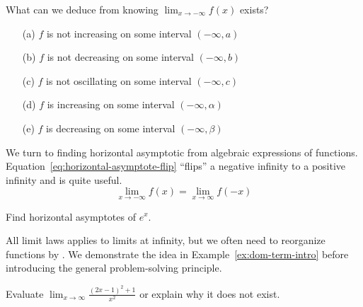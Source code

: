 \documentclass[../main.tex]{subfiles}
\begin{document}
\bigskip

\begin{example}
  What can we deduce from knowing \(\lim_{x \to -\infty} f(x)\) exists? 

  \begin{itemize}
    \item[(a)] \(f\) is not increasing on some interval \((-\infty, a)\)
    \item[(b)] \(f\) is not decreasing on some interval \((-\infty, b)\)
    \item[(c)] \(f\) is not oscillating on some interval \((-\infty, c)\)
    \item[(d)] \(f\) is increasing on some interval \((-\infty, \alpha)\)
    \item[(e)] \(f\) is decreasing on some interval \((-\infty, \beta)\)
  \end{itemize} 
\end{example}
\clearpage

We turn to finding horizontal asymptotic from algebraic expressions of functions. Equation~\eqref{eq:horizontal-asymptote-flip} ``flips'' a negative infinity to a positive infinity and is quite useful.
\begin{equation} \label{eq:horizontal-asymptote-flip}
  \lim_{x \to -\infty} f(x) = \lim_{x \to \infty} f(-x)
\end{equation}
\begin{center}
  \hfill{}
  
  \hfill{}
  
  \hfill{}
\end{center}

\begin{example}
  Find horizontal asymptotes of \(e^{x}\).

\end{example}

All limit laws applies to limits at infinity, but we often need to reorganize functions by . We demonstrate the idea in Example~\ref{ex:dom-term-intro} before introducing the general problem-solving principle.

\begin{example}\label{ex:dom-term-intro}
  Evaluate \(\lim_{x \to \infty} \frac{(2x-1)^{2} + 1}{x^{2}}\) or explain why it does not exist.

\end{example}
\clearpage
\end{document}
